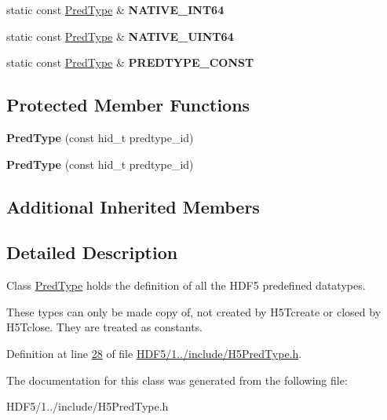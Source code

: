 \begin{DoxyCompactItemize}
\item 
\mbox{\label{class_h5_1_1_pred_type_a26c7f1a813835a9ad9519ccdfee1a1e6}} 
static const \hyperlink{class_h5_1_1_pred_type}{Pred\+Type} \& {\bfseries N\+A\+T\+I\+V\+E\+\_\+\+I\+N\+T64}
\item 
\mbox{\label{class_h5_1_1_pred_type_a04fc41cd698310253ada0e25fef544d4}} 
static const \hyperlink{class_h5_1_1_pred_type}{Pred\+Type} \& {\bfseries N\+A\+T\+I\+V\+E\+\_\+\+U\+I\+N\+T64}
\item 
\mbox{\label{class_h5_1_1_pred_type_a20d5504a97056d3742dc876a197ecd70}} 
static const \hyperlink{class_h5_1_1_pred_type}{Pred\+Type} \& {\bfseries P\+R\+E\+D\+T\+Y\+P\+E\+\_\+\+C\+O\+N\+ST}
\end{DoxyCompactItemize}
\subsection*{Protected Member Functions}
\begin{DoxyCompactItemize}
\item 
\mbox{\label{class_h5_1_1_pred_type_a0473f765a62fffc81506e5454c85e1f5}} 
{\bfseries Pred\+Type} (const hid\+\_\+t predtype\+\_\+id)
\item 
\mbox{\label{class_h5_1_1_pred_type_a0473f765a62fffc81506e5454c85e1f5}} 
{\bfseries Pred\+Type} (const hid\+\_\+t predtype\+\_\+id)
\end{DoxyCompactItemize}
\subsection*{Additional Inherited Members}


\subsection{Detailed Description}
Class \hyperlink{class_h5_1_1_pred_type}{Pred\+Type} holds the definition of all the H\+D\+F5 predefined datatypes. 

These types can only be made copy of, not created by H5\+Tcreate or closed by H5\+Tclose. They are treated as constants. 

Definition at line \hyperlink{_h_d_f5_21_810_81_2include_2_h5_pred_type_8h_source_l00028}{28} of file \hyperlink{_h_d_f5_21_810_81_2include_2_h5_pred_type_8h_source}{H\+D\+F5/1../include/\+H5\+Pred\+Type.\+h}.



The documentation for this class was generated from the following file\+:\begin{DoxyCompactItemize}
\item 
H\+D\+F5/1../include/\+H5\+Pred\+Type.\+h\end{DoxyCompactItemize}
